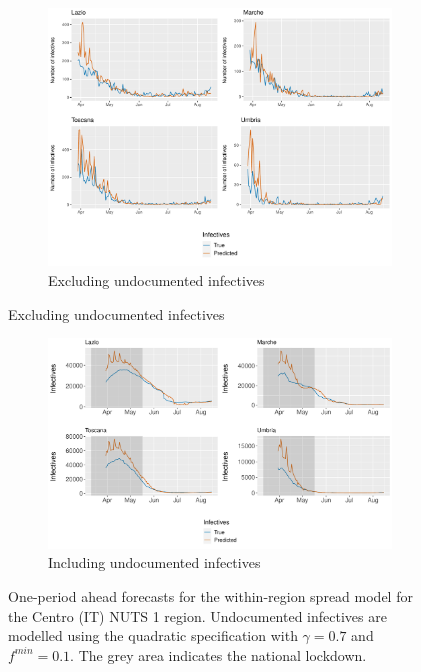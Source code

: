 \documentclass[12pt]{article}
\begin{document}
\begin{appendices}
		\begin{figure}[H]
    	    \centering
    	    \begin{subfigure}{\textwidth}
    	      \centering
    	      \includegraphics[width=0.94\linewidth]{output/model_within_lag14_forecast_start20_Centro (IT)_rolling.pdf}
    	      \caption{Excluding undocumented infectives}
    	      \label{fig:forecast_within_centro_regular}
    	    \end{subfigure}
        \end{figure}
        \begin{figure}[H]\ContinuedFloat
    	    \begin{subfigure}{\textwidth}
    	      \centering
    	      \includegraphics[width=0.94\linewidth]{output/model_within_lag14_forecast_start20_Centro (IT)_UndocQuadratic_rolling.pdf}
    	      \caption{Including undocumented infectives}
    	      \label{fig:forecast_within_centro_undoc}
    	    \end{subfigure}
    	    \caption{One-period ahead forecasts for the within-region spread model for the Centro (IT) NUTS 1 region. Undocumented infectives are modelled using the quadratic specification with $\gamma = 0.7$ and $f^{min}=0.1$. The grey area indicates the national lockdown.}
    	    \label{fig:forecast_within_centro}
        \end{figure}
		

\end{appendices}
\end{document}
